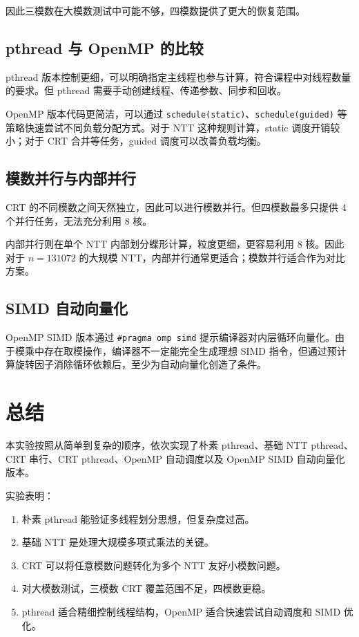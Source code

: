 \documentclass[UTF8,a4paper,12pt]{ctexart}
\begin{document}
因此三模数在大模数测试中可能不够，四模数提供了更大的恢复范围。

\subsection{pthread 与 OpenMP 的比较}

pthread 版本控制更细，可以明确指定主线程也参与计算，符合课程中对线程数量的要求。但 pthread 需要手动创建线程、传递参数、同步和回收。

OpenMP 版本代码更简洁，可以通过 \texttt{schedule(static)}、\texttt{schedule(guided)} 等策略快速尝试不同负载分配方式。对于 NTT 这种规则计算，static 调度开销较小；对于 CRT 合并等任务，guided 调度可以改善负载均衡。

\subsection{模数并行与内部并行}

CRT 的不同模数之间天然独立，因此可以进行模数并行。但四模数最多只提供 4 个并行任务，无法充分利用 8 核。

内部并行则在单个 NTT 内部划分蝶形计算，粒度更细，更容易利用 8 核。因此对于 \(n=131072\) 的大规模 NTT，内部并行通常更适合；模数并行适合作为对比方案。

\subsection{SIMD 自动向量化}

OpenMP SIMD 版本通过 \texttt{\#pragma omp simd} 提示编译器对内层循环向量化。由于模乘中存在取模操作，编译器不一定能完全生成理想 SIMD 指令，但通过预计算旋转因子消除循环依赖后，至少为自动向量化创造了条件。

\section{总结}

本实验按照从简单到复杂的顺序，依次实现了朴素 pthread、基础 NTT pthread、CRT 串行、CRT pthread、OpenMP 自动调度以及 OpenMP SIMD 自动向量化版本。

实验表明：

\begin{enumerate}
  \item 朴素 pthread 能验证多线程划分思想，但复杂度过高。
  \item 基础 NTT 是处理大规模多项式乘法的关键。
  \item CRT 可以将任意模数问题转化为多个 NTT 友好小模数问题。
  \item 对大模数测试，三模数 CRT 覆盖范围不足，四模数更稳。
  \item pthread 适合精细控制线程结构，OpenMP 适合快速尝试自动调度和 SIMD 优化。
\end{enumerate}
\end{document}
